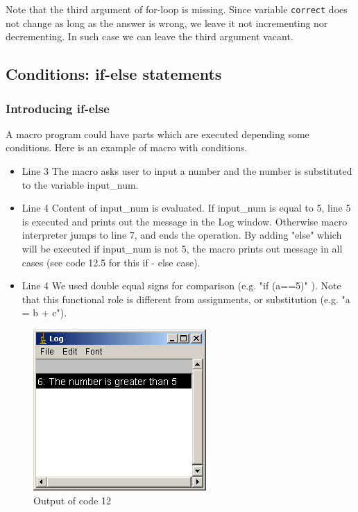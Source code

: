 \documentclass[11pt,a4paper,oneside]{report}
\newcommand{\ilcom}[1]{\texttt{\small#1}}
\begin{document}
Note that the third argument of for-loop is missing. Since variable
\ilcom{correct} does not change as long as the answer is wrong, we leave it not
incrementing nor decrementing. In such case we can leave the third argument
vacant. 

\subsection{Conditions: if-else statements}
\subsubsection{Introducing if-else}
A macro program could have parts which are executed depending some
conditions.
Here is an example of macro with conditions.

\begin{itemize}
\item Line 3 The macro asks user to input a number and the number is substituted to the variable input\_num.
\item Line 4 Content of input\_num is evaluated. If input\_num is equal to 5, line 5 is executed and prints out the message in the Log window. Otherwise macro interpreter jumps to line 7, and ends the operation.  By adding "else" which will be executed if input\_num is not 5, the macro prints out message in all cases (see code 12.5 for this if - else case). 
\item Line 4 We used double equal signs for comparison (e.g. "if (a==5)"
). Note that this functional role is different from assignments, or substitution (e.g. "a = b + c").
\end{itemize}
\begin{figure}[htbp]
\begin{center}
\includegraphics[scale=0.6]{fig/fig2341_code12out.png}
\caption{Output of code 12}
\label{fig:code12 output}
\end{center}
\end{figure} 
\end{document}
